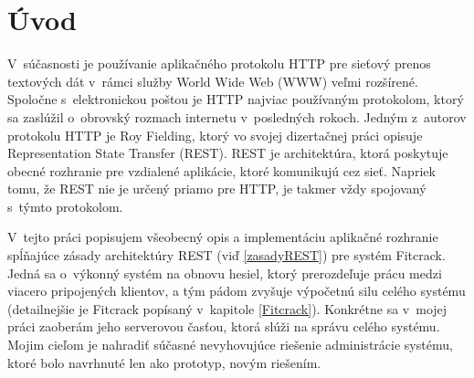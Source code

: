 \documentclass[slovak,cprint]{fitthesis} %
\begin{document}
  \maketitle
  \setlength{\parskip}{0pt}

  {\hypersetup{hidelinks}\tableofcontents}
  
  \ifczech
    \renewcommand\listfigurename{Seznam obrázků}
  \fi
  \ifslovak
    \renewcommand\listfigurename{Zoznam obrázkov}
  \fi
  
  \ifczech
    \renewcommand\listtablename{Seznam tabulek}
  \fi
  \ifslovak
    \renewcommand\listtablename{Zoznam tabuliek}
  \fi

  \ifODSAZ
    \setlength{\parskip}{0.5\bigskipamount}
  \else
    \setlength{\parskip}{0pt}
  \fi

  \iftwoside
    \cleardoublepage
  \fi


\chapter{Úvod}\label{uvod}
V~súčasnosti je používanie aplikačného protokolu HTTP pre sieťový prenos textových dát v~rámci služby World Wide Web (WWW) veľmi rozšírené. Spoločne s~elektronickou poštou je HTTP najviac používaným protokolom, ktorý sa zaslúžil o~obrovský rozmach internetu v~posledných rokoch. Jedným z~autorov protokolu HTTP je Roy Fielding, ktorý vo svojej dizertačnej práci opisuje Representation State Transfer (REST). REST je architektúra, ktorá poskytuje obecné rozhranie pre vzdialené aplikácie, ktoré komunikujú cez sieť. Napriek tomu, že REST nie je určený priamo pre HTTP, je takmer vždy spojovaný s~týmto protokolom.

V~tejto práci popisujem všeobecný opis a implementáciu aplikačné rozhranie spĺňajúce zásady architektúry REST (viď \ref{zasadyREST}) pre systém Fitcrack. Jedná sa o~výkonný systém na obnovu hesiel, ktorý prerozdeľuje prácu medzi viacero pripojených klientov, a tým pádom zvyšuje výpočetnú silu celého systému (detailnejšie je Fitcrack popísaný v~kapitole \ref{Fitcrack}). Konkrétne sa v~mojej práci zaoberám jeho serverovou časťou, ktorá slúži na správu celého systému. Mojim cieľom je nahradiť súčasné nevyhovujúce riešenie administrácie systému, ktoré bolo navrhnuté len ako prototyp, novým riešením.
\end{document}
